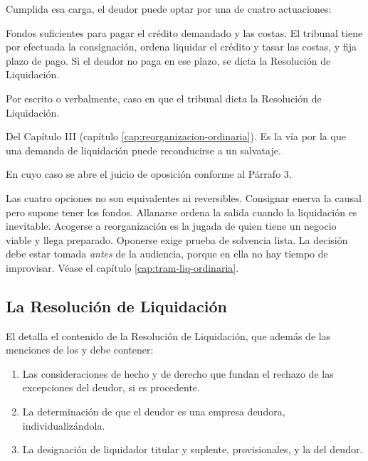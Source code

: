 Cumplida esa carga, el deudor puede optar por una de cuatro actuaciones:

\begin{description}[leftmargin=0pt,style=nextline,font=\sffamily\bfseries]
  \item[a) Consignar] Fondos suficientes para pagar el crédito demandado y las costas. El
  tribunal tiene por efectuada la consignación, ordena liquidar el crédito y tasar las
  costas, y fija plazo de pago. Si el deudor no paga en ese plazo, se dicta la Resolución de
  Liquidación.

  \item[b) Allanarse] Por escrito o verbalmente, caso en que el tribunal dicta la
  Resolución de Liquidación.

  \item[c) Acogerse a reorganización] Del Capítulo III (capítulo
  \ref{cap:reorganizacion-ordinaria}). Es la vía por la que una demanda de liquidación puede
  reconducirse a un salvataje.

  \item[d) Oponerse] En cuyo caso se abre el juicio de oposición conforme al Párrafo 3.
\end{description}

\begin{foco}
Las cuatro opciones no son equivalentes ni reversibles. Consignar enerva la causal pero
supone tener los fondos. Allanarse ordena la salida cuando la liquidación es inevitable.
Acogerse a reorganización es la jugada de quien tiene un negocio viable y llega preparado.
Oponerse exige prueba de solvencia lista. La decisión debe estar tomada \emph{antes} de la
audiencia, porque en ella no hay tiempo de improvisar. Véase el capítulo
\ref{cap:tram-liq-ordinaria}.
\end{foco}

\subsection{La Resolución de Liquidación}

El  detalla el contenido de la Resolución de Liquidación, que además de las
menciones de los  y  debe contener:

\begin{enumerate}
  \item Las consideraciones de hecho y de derecho que fundan el rechazo de las excepciones
  del deudor, si es procedente.
  \item La determinación de que el deudor es una empresa deudora, individualizándola.
  \item La designación de liquidador titular y suplente, provisionales, y la
   del deudor.
\end{enumerate}

